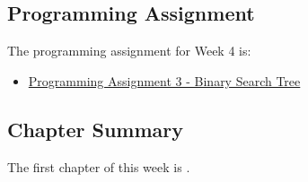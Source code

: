 \subsection{Programming Assignment}

The programming assignment for Week 4 is:

\begin{itemize}
    \item \href{https://github.com/QuantumCompiler/CU/tree/main/CSPB%202270%20-%20Data%20Structures/CSPB%202270%20-%20Programming%20Assignments/CSPB%202270%20-%20Assignment%203%20-%20Binary%20Search%20Tree}{Programming Assignment 3 - Binary Search Tree}
\end{itemize}

\subsection{Chapter Summary}

The first chapter of this week is .

